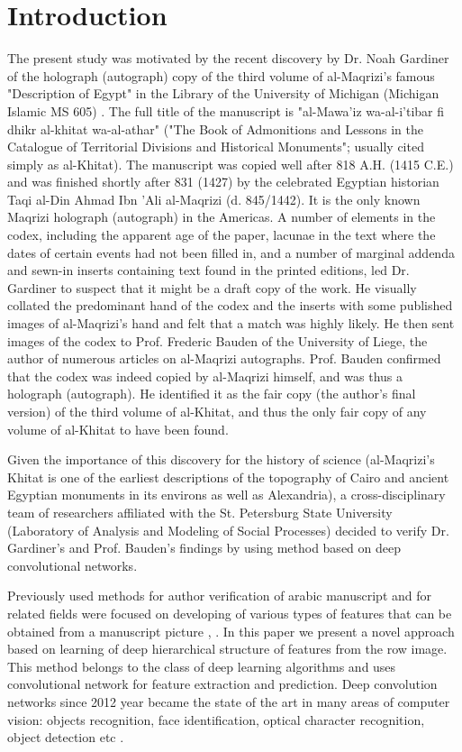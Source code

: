 \documentclass[conference,a4paper,twocolumn]{IEEEtran}
\begin{document}
\section{Introduction}
\label{sec:introduction}
The present study was motivated by the recent discovery by Dr. Noah Gardiner of the holograph (autograph) copy of the third volume of al-Maqrizi's famous "Description of Egypt" in the Library of the University of Michigan (Michigan Islamic MS 605) \cite{Noah}. The full title of the manuscript is "al-Mawa'iz wa-al-i'tibar fi dhikr al-khitat wa-al-athar" ("The Book of Admonitions and Lessons in the Catalogue of Territorial Divisions and Historical Monuments"; usually cited simply as al-Khitat). The manuscript was copied well after 818 A.H. (1415 C.E.) and was finished shortly after 831 (1427) by the celebrated Egyptian historian Taqi al-Din Ahmad Ibn 'Ali al-Maqrizi (d. 845/1442). It is the only known Maqrizi holograph (autograph) in the Americas. A number of elements in the codex, including the apparent age of the paper, lacunae in the text where the dates of certain events had not been filled in, and a number of marginal addenda and sewn-in inserts containing text found in the printed editions, led Dr. Gardiner to suspect that it might be a draft copy of the work. He visually collated the predominant hand of the codex and the inserts with some published images of al-Maqrizi’s hand and felt that a match was highly likely. He then sent images of the codex to Prof. Frederic Bauden of the University of Liege, the author of numerous articles on al-Maqrizi autographs. Prof. Bauden confirmed that the codex was indeed copied by al-Maqrizi himself, and was thus a holograph (autograph). He identified it as the fair copy (the author’s final version) of the third volume of al-Khitat, and thus the only fair copy of any volume of al-Khitat to have been found.

Given the importance of this discovery for the history of science (al-Maqrizi's Khitat is one of the earliest descriptions of the topography of Cairo and ancient Egyptian monuments in its environs as well as Alexandria), a cross-disciplinary team of researchers affiliated with the St. Petersburg State University (Laboratory of Analysis and Modeling of Social Processes) decided to verify Dr. Gardiner’s and Prof. Bauden’s findings by using method based on deep convolutional networks.

Previously used methods for author verification of arabic manuscript and for related fields were focused on developing of various types of features that can be obtained from a manuscript picture \cite{MBulacu}, \cite{DFecker}. In this paper we present a novel approach based on learning of deep hierarchical structure of features from the row image. This method belongs to the class of deep learning algorithms \cite{DL} and uses convolutional network \cite{CNN} for feature extraction and prediction. Deep convolution networks since 2012 year \cite{Alexnet} became the state of the art in many areas of computer vision: objects recognition, face identification, optical character recognition, object detection etc \cite{DL}.
\end{document}
